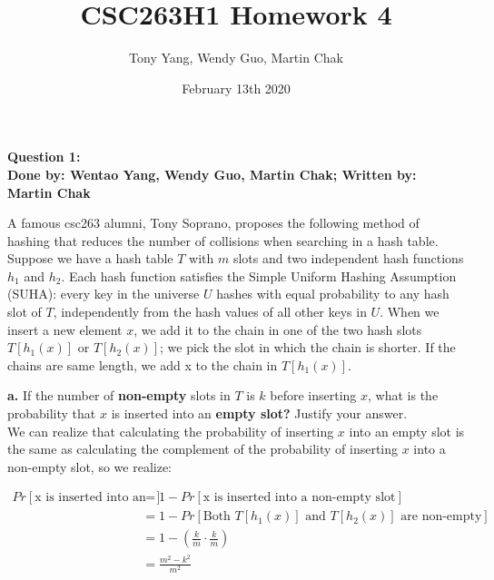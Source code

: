 \documentclass[20pt]{article}
\title{CSC263H1 Homework 4}
\author{Tony Yang, Wendy Guo, Martin Chak}
\date{February 13th 2020}
\begin{document}

\maketitle


\newpage


\noindent
\textbf{Question 1:}\\
\textbf{Done by: Wentao Yang, Wendy Guo, Martin Chak; Written by: Martin Chak}\\

\noindent
\begin{text}
    A famous csc263 alumni, Tony Soprano, proposes the following method of hashing that reduces the number of collisions when searching in a hash table. Suppose we have a hash table $T$ with $m$ slots and two independent hash functions $h_1$ and $h_2$. Each hash function satisfies the Simple Uniform Hashing Assumption (SUHA): every key in the universe $U$ hashes with equal probability to any hash slot of $T$, independently from the hash values of all other keys in $U$. When we insert a new element $x$, we add it to the chain in one of the two hash slots $T[h_1(x)]$ or $T[h_2(x)]$; we pick the slot in which the chain is shorter. If the chains are same length, we add x to the chain in $T[h_1(x)]$.\\
\end{text}

\noindent
\begin{text}
    \textbf{a.} If the number of \textbf{non-empty} slots in $T$ is $k$ before inserting $x$, what is the probability that $x$ is inserted into an \textbf{empty slot?} Justify your answer.\\
    
    \noindent
    We can realize that calculating the probability of inserting $x$ into an empty slot is the same as calculating the complement of the probability of inserting $x$ into a non-empty slot, so we realize:
\end{text}

\begin{align*}
    Pr[\text{x is inserted into an empty slot}] &= 1 - Pr[\text{x is inserted into a non-empty slot}]\\
    &= 1 - Pr[\text{Both $T[h_1(x)]$ and $T[h_2(x)]$ are non-empty}]\\
    &= 1 - (\frac{k}{m}\cdot\frac{k}{m})\tag{By SUHA assumptions}\\
    &= \frac{m^2-k^2}{m^2}
\end{align*}
\end{document}

